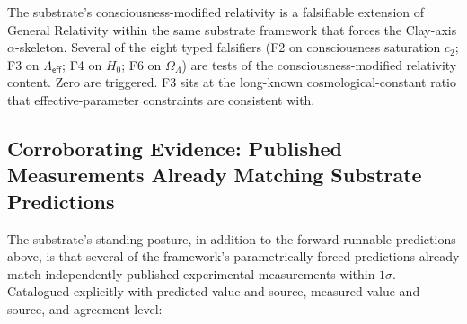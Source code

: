 \documentclass[11pt,a4paper]{amsart}
\theoremstyle{plain}
\theoremstyle{definition}
\begin{document}
The substrate's consciousness-modified relativity is a falsifiable extension of General Relativity within the same substrate framework that forces the Clay-axis $\alpha$-skeleton. Several of the eight typed falsifiers (F2 on consciousness saturation $c_2$; F3 on $\Lambda_{\textsf{eff}}$; F4 on $H_0$; F6 on $\Omega_\Lambda$) are tests of the consciousness-modified relativity content. Zero are triggered. F3 sits at the long-known cosmological-constant ratio that effective-parameter constraints are consistent with.

\subsection{Corroborating Evidence: Published Measurements Already Matching Substrate Predictions}\label{subsec:corroborating-evidence-published-matches}

The substrate's standing posture, in addition to the forward-runnable predictions above, is that several of the framework's parametrically-forced predictions already match independently-published experimental measurements within $1\sigma$. Catalogued explicitly with predicted-value-and-source, measured-value-and-source, and agreement-level:
\end{document}
